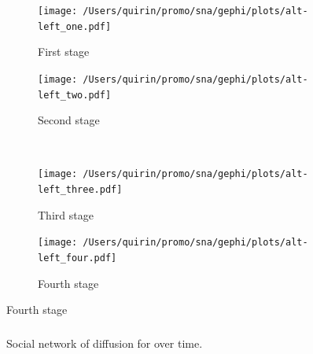 \documentclass[
  a4paper,
  ]{scrartcl}
\begin{document}
      \begin{figure}[H]
        \caption{Social network of diffusion for  over time.}
        \centering
        \begin{subfigure}{.45\linewidth}
          \caption{First stage}
          \centering
          \texttt{[image: /Users/quirin/promo/sna/gephi/plots/alt-left\_one.pdf]}
        \end{subfigure}
        \begin{subfigure}{.45\linewidth}
          \caption{Second stage}
          \centering
          \texttt{[image: /Users/quirin/promo/sna/gephi/plots/alt-left\_two.pdf]}
        \end{subfigure}\\
        \begin{subfigure}{.45\linewidth}
          \caption{Third stage}
          \centering
          \texttt{[image: /Users/quirin/promo/sna/gephi/plots/alt-left\_three.pdf]}
        \end{subfigure}
        \begin{subfigure}{.45\linewidth}
          \caption{Fourth stage}
          \centering
          \texttt{[image: /Users/quirin/promo/sna/gephi/plots/alt-left\_four.pdf]}
        \end{subfigure}
      \end{figure}

    \subsubsection{}

      \begin{figure}[H]
        \caption{Social network of diffusion for  over time.}
        \centering
      \end{figure}
\end{document}
